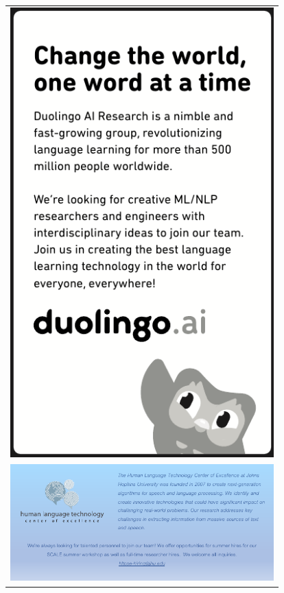 \begin{center}
\begin{tabular}{c}
  \includegraphics[width=4in]{content/ads/silver/duolingo-emnlp21-quarter-ad.pdf} \\
  \includegraphics[width=4in]{content/ads/silver/emnlp_ad.pdf} \\
\end{tabular}
\end{center}


